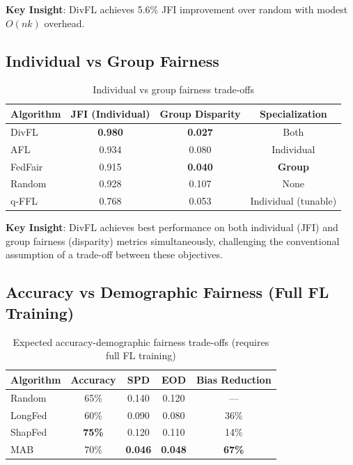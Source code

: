 \documentclass{article}
\begin{document}
\textbf{Key Insight}: DivFL achieves 5.6\% JFI improvement over random with modest $O(nk)$ overhead.

\subsection{Individual vs Group Fairness}

\begin{table}[t]
\centering
\small
\begin{tabular}{@{}lccc@{}}
\toprule
\textbf{Algorithm} & \textbf{JFI (Individual)} & \textbf{Group Disparity} & \textbf{Specialization} \\
\midrule
DivFL & \textbf{0.980} & \textbf{0.027} & Both \\
AFL & 0.934 & 0.080 & Individual \\
FedFair & 0.915 & \textbf{0.040} & \textbf{Group} \\
Random & 0.928 & 0.107 & None \\
q-FFL & 0.768 & 0.053 & Individual (tunable) \\
\bottomrule
\end{tabular}
\caption{Individual vs group fairness trade-offs}
\label{tab:fairness-types}
\end{table}

\textbf{Key Insight}: DivFL achieves best performance on both individual (JFI) and group fairness (disparity) metrics simultaneously, challenging the conventional assumption of a trade-off between these objectives.

\subsection{Accuracy vs Demographic Fairness (Full FL Training)}

\begin{table}[t]
\centering
\small
\begin{tabular}{@{}lcccc@{}}
\toprule
\textbf{Algorithm} & \textbf{Accuracy} & \textbf{SPD} & \textbf{EOD} & \textbf{Bias Reduction} \\
\midrule
Random    & 65\% & 0.140 & 0.120 & --- \\
LongFed   & 60\% & 0.090 & 0.080 & 36\% \\
ShapFed   & \textbf{75\%} & 0.120 & 0.110 & 14\% \\
MAB       & 70\% & \textbf{0.046} & \textbf{0.048} & \textbf{67\%} \\
\bottomrule
\end{tabular}
\caption{Expected accuracy-demographic fairness trade-offs (requires full FL training)}
\label{tab:acc-demo}
\end{table}
\end{document}
